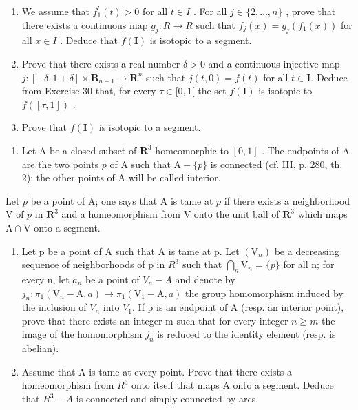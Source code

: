 \begin{enumerate}
\def\labelenumi{\alph{enumi})}
\item
  We assume that \(f_{1}^{\prime}(t) > 0\) for all \(t \in I\) . For all \(j \in \{2, \ldots, n\}\) , prove that there exists a continuous map \(g_{j} \colon R \to R\) such that \(f_{j}(x) = g_{j}(f_{1}(x))\) for all \(x \in I\) . Deduce that \(f(\mathbf{I})\) is isotopic to a segment.
\item
   Prove that there exists a real number \(\delta > 0\) and a continuous injective map \(j\colon [-\delta, 1 + \delta] \times \mathbf{B}_{n-1} \to \mathbf{R}^n\) such that \(j(t, 0) = f(t)\) for all \(t \in \mathbf{I} .\) Deduce from Exercise 30 that, for every \(\tau \in [0, 1[\) the set \(f(\mathbf{I})\) is isotopic to \(f([\tau, 1])\) .
\item
  Prove that \(f(\mathbf{I})\) is isotopic to a segment.
\end{enumerate}

\begin{enumerate}
\def\labelenumi{\arabic{enumi})}
\setcounter{enumi}{31}
\tightlist
\item
  Let A be a closed subset of \(\mathbf{R}^3\) homeomorphic to \([0,1]\) . The endpoints of A are the two points \(p\) of A such that \(\mathrm{A} - \{p\}\) is connected (cf. III, p. 280, th. 2); the other points of A will be called interior.
\end{enumerate}

Let \(p\) be a point of A; one says that A is tame at \(p\) if there exists a neighborhood V of \(p\) in \(\mathbf{R}^3\) and a homeomorphism from V onto the unit ball of \(\mathbf{R}^3\) which maps \(\mathrm{A} \cap \mathrm{V}\) onto a segment.

\begin{enumerate}
\def\labelenumi{\alph{enumi})}
\item
  Let p be a point of A such that A is tame at p. Let \((\mathrm{V}_{n})\) be a decreasing sequence of neighborhoods of p in \(R^{3}\) such that \(\bigcap_{n}\mathrm{V}_{n}=\{p\}\) for all n; for every n, let \(a_{n}\) be a point of \(V_{n}-A\) and denote by \(j_{n}\colon\pi_{1}(\mathrm{V}_{n}-\mathrm{A},a)\to\pi_{1}(\mathrm{V}_{1}-\mathrm{A},a)\) the group homomorphism induced by the inclusion of \(V_{n}\) into \(V_{1}\). If p is an endpoint of A (resp. an interior point), prove that there exists an integer m such that for every integer \(n\geqslant m\) the image of the homomorphism \(j_{n}\) is reduced to the identity element (resp. is abelian).
\item
  Assume that A is tame at every point. Prove that there exists a homeomorphism from \(R^{3}\) onto itself that maps A onto a segment. Deduce that \(R^{3}-A\) is connected and simply connected by arcs.
\end{enumerate}

